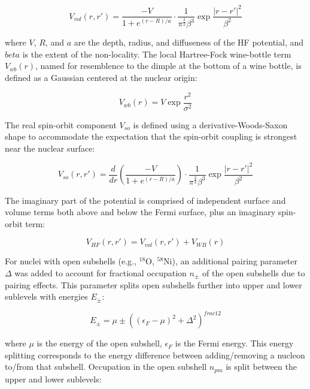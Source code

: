 \begin{equation}
    V_{vol}(r,r') =
    \dfrac{-V}{1+e^{(r-R)/a}}\cdot\dfrac{1}{\pi^{\frac{3}{2}}\beta^{3}}
    \exp{\frac{|r-r'|^{2}}{\beta^{2}}}
\end{equation}

where $V$, $R$, and $a$ are the depth, radius, and diffuseness of the HF potential,
and $beta$ is the extent of the non-locality. The local Hartree-Fock wine-bottle
term $V_{wb}(r)$, named for resemblence to the dimple at the bottom of a wine
bottle, is defined as a Gaussian centered at the nuclear origin:

\begin{equation}
    V_{wb}(r) = V\exp{\frac{r^{2}}{\sigma^{2}}}
\end{equation}

The real spin-orbit component $V_{so}$
is defined using a derivative-Woods-Saxon shape to
accommodate the expectation that the spin-orbit coupling is strongest near the
nuclear surface:

\begin{equation}
    V_{so}(r,r') =
    \frac{d}{dr} \left(\dfrac{-V}{1+e^{(r-R)/a}}\right)\cdot\dfrac{1}{\pi^{\frac{3}{2}}\beta^{3}}
\exp{\frac{|r-r'|^{2}}{\beta^{2}}}
\end{equation}

The imaginary part of the potential is comprised of independent surface and volume terms
both above and below the Fermi surface, plus an imaginary spin-orbit term:

\begin{equation}
    V_{HF}(r,r') = V_{vol}(r,r') + V_{WB}(r)
\end{equation}


For nuclei with open subshells (e.g., $^{18}$O, $^{58}$Ni), an additional
pairing parameter $\Delta$ was added to
account for fractional occupation $n_{\pm}$ of the open subshells due to pairing
effects. This parameter splits open subshells further into upper and lower sublevels
with energies $E_{\pm}$:

\begin{equation}
    E_{\pm} = \mu \pm ((\epsilon_{F}-\mu)^{2} + \Delta^{2})^{frac{1}{2}}
\end{equation}

where $\mu$ is the energy of the open subshell, $\epsilon_{F}$ is the Fermi
energy. This energy splitting corresponds to the energy difference between
adding/removing a nucleon to/from that subshell. Occupation in the open subshell
$n_{pm}$ is split between the upper and lower sublevels:


